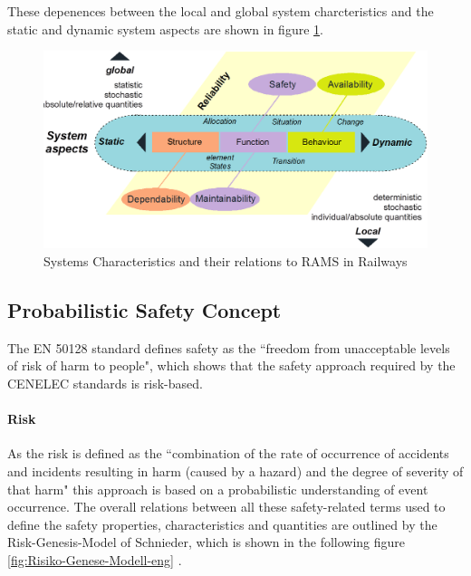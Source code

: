 \documentclass{template/openetcs_report}
\begin{document}
These depenences between the local and global system charcteristics and the static and dynamic system aspects are shown in figure \ref{fig:Reliability-RAMS}. 

\begin{figure}[htbp]
\centering
\includegraphics[width=0.7\linewidth]{images/bld_Reliability-system-characteristics}
\caption{Systems Characteristics and their relations to RAMS in Railways \cite{Schnieder.2013}}
\label{fig:Reliability-RAMS}
\end{figure}


\subsection{Probabilistic Safety Concept}

The EN 50128 standard defines safety as the ``freedom from unacceptable levels of risk of harm to people", which shows that the safety approach required by the CENELEC standards is risk-based.

\paragraph{Risk}

 As the risk is defined as the ``combination of the rate of occurrence of accidents and incidents resulting in harm (caused by a hazard) and the degree of severity  of that harm" this approach is based on a probabilistic understanding of event occurrence. The overall relations between all these safety-related terms used to define the safety properties, characteristics and quantities are outlined by the Risk-Genesis-Model of Schnieder, which is shown in the following figure \ref{fig:Risiko-Genese-Modell-eng} \cite{Schnieder.2010}.
\end{document}
